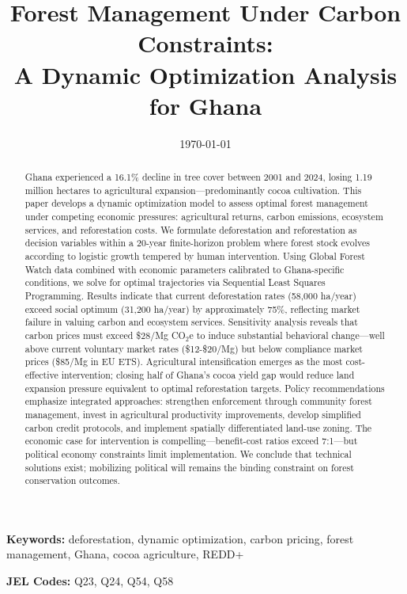 \documentclass[12pt,a4paper]{article}
\title{\textbf{Forest Management Under Carbon Constraints: \\
A Dynamic Optimization Analysis for Ghana}}
\author{
}
\date{\today}
\begin{document}
\maketitle

\begin{abstract}
Ghana experienced a 16.1\% decline in tree cover between 2001 and 2024, losing 1.19 million hectares to agricultural expansion—predominantly cocoa cultivation. This paper develops a dynamic optimization model to assess optimal forest management under competing economic pressures: agricultural returns, carbon emissions, ecosystem services, and reforestation costs. We formulate deforestation and reforestation as decision variables within a 20-year finite-horizon problem where forest stock evolves according to logistic growth tempered by human intervention. Using Global Forest Watch data combined with economic parameters calibrated to Ghana-specific conditions, we solve for optimal trajectories via Sequential Least Squares Programming. Results indicate that current deforestation rates (58,000 ha/year) exceed social optimum (31,200 ha/year) by approximately 75\%, reflecting market failure in valuing carbon and ecosystem services. Sensitivity analysis reveals that carbon prices must exceed \$28/Mg CO$_2$e to induce substantial behavioral change—well above current voluntary market rates (\$12-\$20/Mg) but below compliance market prices (\$85/Mg in EU ETS). Agricultural intensification emerges as the most cost-effective intervention; closing half of Ghana's cocoa yield gap would reduce land expansion pressure equivalent to optimal reforestation targets. Policy recommendations emphasize integrated approaches: strengthen enforcement through community forest management, invest in agricultural productivity improvements, develop simplified carbon credit protocols, and implement spatially differentiated land-use zoning. The economic case for intervention is compelling—benefit-cost ratios exceed 7:1—but political economy constraints limit implementation. We conclude that technical solutions exist; mobilizing political will remains the binding constraint on forest conservation outcomes.
\end{abstract}

\vspace{0.3in}
\noindent \textbf{Keywords:} deforestation, dynamic optimization, carbon pricing, forest management, Ghana, cocoa agriculture, REDD+

\vspace{0.2in}
\noindent \textbf{JEL Codes:} Q23, Q24, Q54, Q58
\end{document}
